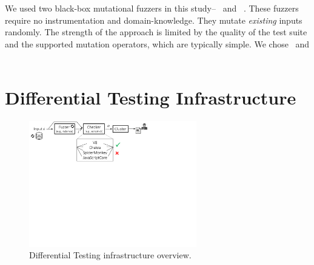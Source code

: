 \documentclass[10pt,conference,anonymous]{IEEEtran}
\begin{document}
We used two black-box mutational fuzzers in this
study--\radamsa~\cite{radamsa} and \quickfuzz~\cite{quickfuzz}. These
fuzzers require no instrumentation and domain-knowledge. They mutate
\emph{existing} inputs randomly. The strength of the approach is
limited by the quality of the test suite and the supported mutation
operators, which are typically simple. We chose \radamsa\ and
\quickfuzz\  

\section{Differential Testing Infrastructure}
\label{sec:design}

\begin{figure}[t!]
  \centering
  \includegraphics[trim=0 350 0 0,clip,width=0.65\textwidth]{diff-testing-runtimes}
  \caption{\label{fig:workflow}Differential Testing infrastructure overview.}
\end{figure}
\end{document}
